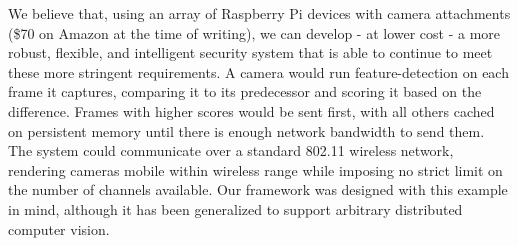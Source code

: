 We believe that, using an array of Raspberry Pi devices with camera attachments
(\$70 on Amazon at the time of writing), we can develop - at lower cost - a more
robust, flexible, and intelligent security system that is able to continue to meet
these more stringent requirements.  A camera would run feature-detection on each frame it captures,
comparing it to its predecessor and scoring it based on the difference.  Frames with higher
scores would be sent first, with all others cached on persistent memory
until there is enough network bandwidth to send them.  The system could communicate
over a standard 802.11 wireless network, rendering cameras mobile within wireless range
while imposing no strict limit on the number of channels available.  Our framework was
designed with this example in mind, although it has been generalized to support arbitrary
distributed computer vision.

\label{sec:motivation}